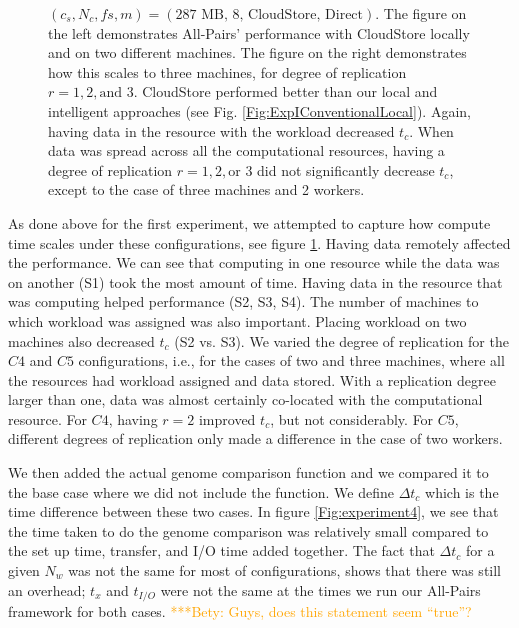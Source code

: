 \documentclass{rspublic}
\newcommand{\micnote}[1]{ {\textcolor{blue} { ***Michael: #1 }}}
\newcommand{\betynote}[1]{ {\textcolor{orange} { ***Bety: #1 }}}
\newcommand{\jhanote}[1]{} \newcommand{\micnote}[1]{}\newcommand{\betynote}[1]{} \newcommand{\fixme}[1]{}
\begin{document}
\begin{figure}
\begin{center}
{\label{Fig:experiment3:b}
}
\caption{$(c_s, N_c, f\!s, m) = (\mbox{287 MB, 8, CloudStore,
Direct})$. The figure on the left demonstrates All-Pairs' performance
with CloudStore locally and on two different machines. The figure on the
right demonstrates how this scales to three machines, for degree of
replication $r=1,2,\mbox{and } 3$. CloudStore performed better than our
local and intelligent approaches (see Fig.
\ref{Fig:ExpIConventionalLocal}). Again,
having data in the resource with the workload decreased $t_c$. When data
was spread across all the computational resources, having a degree of
replication $r = 1, 2, \mbox{or } 3$ did not significantly decrease
$t_c$, except to the case of three machines and 2 workers.}
\label{Fig:experiment3}
\end{center}
\end{figure}


As done above for the first experiment, we attempted to capture how
compute time scales under these configurations, see figure
\ref{Fig:experiment3}. Having data remotely affected the performance. We
can see that computing in one resource while the data was on another
(S1) took the most amount of time. Having data in the resource that was
computing helped performance (S2, S3, S4). The number of machines to
which workload was assigned was also important. Placing workload on two
machines also decreased $t_c$ (S2 vs. S3). We varied the degree of
replication for the $C4$ and $C5$ configurations, i.e., for the cases of
two and three machines, where all the resources had workload assigned
and data stored. With a replication degree larger than one, data was
almost certainly co-located with the computational resource. For $C4$, having $r = 2$ improved $t_c$, but not
considerably. For $C5$, different degrees of replication only made a
difference in the case of two workers.

We then added the actual genome comparison function and we compared it
to the base case where we did not include the function. We define $\Delta t_c$
which is the time difference between these two cases. In figure
\ref{Fig:experiment4}, we see that the time taken to do the genome
comparison was relatively small compared to the set up time, transfer,
and I/O time added together. The fact that $\Delta t_c$ for a given
$N_w$ was not the same for most of configurations, shows that there was
still an overhead; $t_x$ and $t_{I/O}$ were not the same at the
times we run our All-Pairs framework for both cases. \betynote{Guys,
does this statement seem ``true''?}
\end{document}
